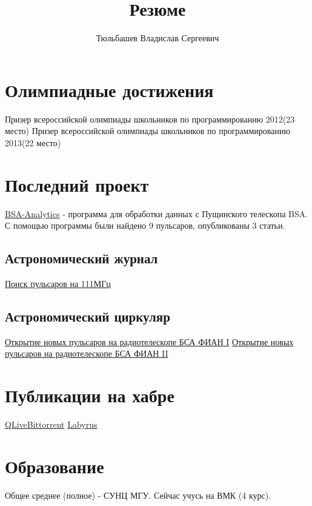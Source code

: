 \documentclass[a4paper, 8pt]{article}
\title{\Huge Резюме}
\author{\Huge Тюльбашев Владислав Сергеевич}
\begin{document}
\maketitle
\section{Олимпиадные достижения} {
	Призер всероссийской олимпиады школьников по программированию 2012(23 место) \newline
	Призер всероссийской олимпиады школьников по программированию 2013(22 место)
}

\section{Последний проект} {
	\href{https://blog.vtyulb.ru/projects/BSA-Analytics}{BSA-Analytics} - программа для обработки данных с 
	Пущинского телескопа BSA. С помощью программы были найдено 9 пульсаров, опубликованы 3 статьи.
	\subsection{Астрономический журнал} {\href{http://adsabs.harvard.edu/abs/2016ARep...60..220T}{Поиск пульсаров на 111МГц} }
	\subsection{Астрономический циркуляр} {
		\href{http://comet.sai.msu.ru/~gmr/AC/AC1624.pdf}{Открытие новых пульсаров на радиотелескопе БСА ФИАН I} \newline
		\href{http://comet.sai.msu.ru/~gmr/AC/AC1625.pdf}{Открытие новых пульсаров на радиотелескопе БСА ФИАН II}
	}
}

\section{Публикации на хабре} {
    \href{http://habrahabr.ru/post/185770/}{QLiveBittorrent} \newline
    \href{http://habrahabr.ru/post/177807/}{Labyrus}
}

\section{Образование} {
    Общее среднее (полное) - СУНЦ МГУ.
    Сейчас учусь на ВМК (4 курс).
}
\end{document}
